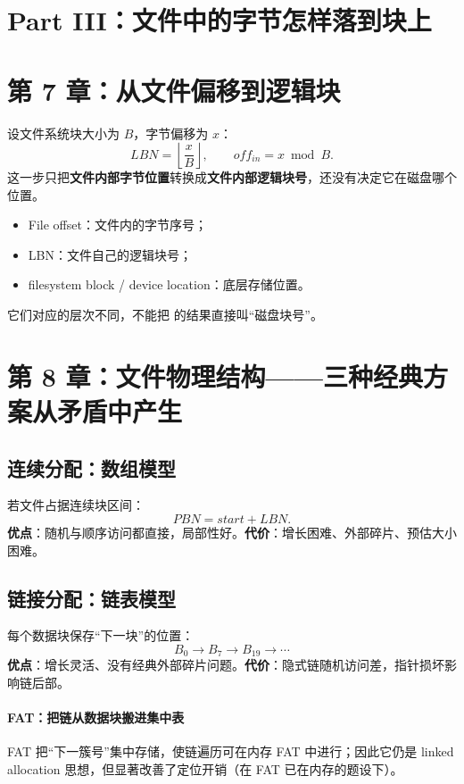 \documentclass[11pt,a4paper]{ctexart}
\newcommand{\kw}[1]{\textbf{#1}}
\newcommand{\code}[1]{\texttt{\detokenize{#1}}}
\begin{document}
\section{Part III：文件中的字节怎样落到块上}

\section{第 7 章：从文件偏移到逻辑块}
设文件系统块大小为 $B$，字节偏移为 $x$：
\[
\boxed{LBN=\left\lfloor\frac{x}{B}\right\rfloor},\qquad
\boxed{off_{in}=x\bmod B}.
\]
这一步只把\kw{文件内部字节位置}转换成\kw{文件内部逻辑块号}，还没有决定它在磁盘哪个位置。

\begin{warn}[三个“地址”不要混]
\begin{itemize}
  \item File offset：文件内的字节序号；
  \item LBN：文件自己的逻辑块号；
  \item filesystem block / device location：底层存储位置。
\end{itemize}
它们对应的层次不同，不能把 \code{offset/B} 的结果直接叫“磁盘块号”。
\end{warn}

\section{第 8 章：文件物理结构——三种经典方案从矛盾中产生}

\subsection{连续分配：数组模型}
若文件占据连续块区间：
\[
PBN = start + LBN.
\]
\kw{优点}：随机与顺序访问都直接，局部性好。\kw{代价}：增长困难、外部碎片、预估大小困难。

\subsection{链接分配：链表模型}
每个数据块保存“下一块”的位置：
\[
B_0\to B_7\to B_{19}\to\cdots
\]
\kw{优点}：增长灵活、没有经典外部碎片问题。\kw{代价}：隐式链随机访问差，指针损坏影响链后部。

\paragraph{FAT：把链从数据块搬进集中表}
FAT 把“下一簇号”集中存储，使链遍历可在内存 FAT 中进行；因此它仍是 linked allocation 思想，但显著改善了定位开销（在 FAT 已在内存的题设下）。
\end{document}
